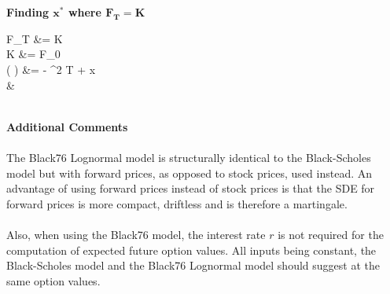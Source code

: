 \documentclass{article}
\begin{document}
\begin{minipage}[t]{0.5\textwidth}
\begin{tcolorbox}[height=12.4cm,boxsep=5pt,arc=0pt,auto outer arc,colback=white,colframe=black]
	\noindent \textbf{Finding $\boldsymbol{x^*}$ where $\boldsymbol{F_T=K}$}
	\begin{flalign*}
	F_T &= K\\
	K &= F_0 \exp{}\\
	\log \left(  \right) &= - \sigma^2 T + \sigma {} x\\
	&
	\end{flalign*}\\
	\noindent \textbf{Additional Comments}\\ \\
	The Black76 Lognormal model is structurally identical to the Black-Scholes model but with forward prices, as opposed to stock prices, used instead. An advantage of using forward prices instead of stock prices is that the SDE for forward prices is more compact, driftless and is therefore a martingale.\\ \\
	Also, when using the Black76 model, the interest rate $r$ is not required for the computation of expected future option values. All inputs being constant, the Black-Scholes model and the Black76 Lognormal model should suggest at the same option values.
\end{tcolorbox}
\end{minipage}\\ 
\end{document}
